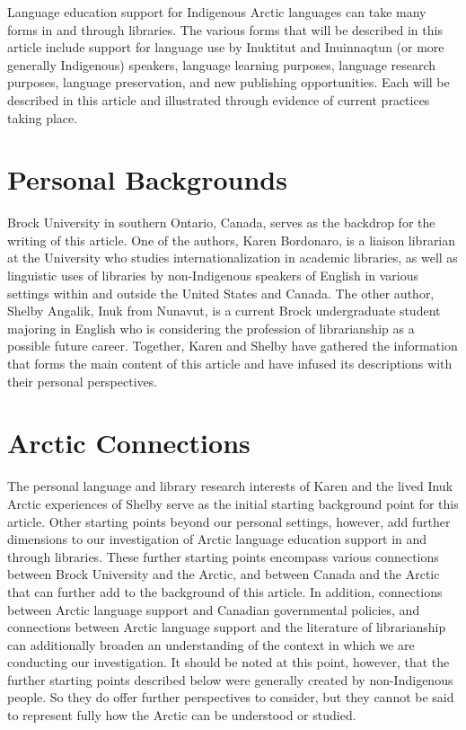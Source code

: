\documentclass[a4paper,
fontsize=11pt,
oneside,
numbers=noperiodatend,
parskip=half-,
bibliography=totoc,
final
]{scrartcl}
\begin{document}
Language education support for Indigenous Arctic languages can take many
forms in and through libraries. The various forms that will be described
in this article include support for language use by Inuktitut and
Inuinnaqtun (or more generally Indigenous) speakers, language learning
purposes, language research purposes, language preservation, and new
publishing opportunities. Each will be described in this article and
illustrated through evidence of current practices taking place.

\hypertarget{personal-backgrounds}{%
\section{Personal Backgrounds}\label{personal-backgrounds}}

Brock University in southern Ontario, Canada, serves as the backdrop for
the writing of this article. One of the authors, Karen Bordonaro, is a
liaison librarian at the University who studies internationalization in
academic libraries, as well as linguistic uses of libraries by
non-Indigenous speakers of English in various settings within and
outside the United States and Canada. The other author, Shelby Angalik,
Inuk from Nunavut, is a current Brock undergraduate student majoring in
English who is considering the profession of librarianship as a possible
future career. Together, Karen and Shelby have gathered the information
that forms the main content of this article and have infused its
descriptions with their personal perspectives.

\hypertarget{arctic-connections}{%
\section{Arctic Connections}\label{arctic-connections}}

The personal language and library research interests of Karen and the
lived Inuk Arctic experiences of Shelby serve as the initial starting
background point for this article. Other starting points beyond our
personal settings, however, add further dimensions to our investigation
of Arctic language education support in and through libraries. These
further starting points encompass various connections between Brock
University and the Arctic, and between Canada and the Arctic that can
further add to the background of this article. In addition, connections
between Arctic language support and Canadian governmental policies, and
connections between Arctic language support and the literature of
librarianship can additionally broaden an understanding of the context
in which we are conducting our investigation. It should be noted at this
point, however, that the further starting points described below were
generally created by non-Indigenous people. So they do offer further
perspectives to consider, but they cannot be said to represent fully how
the Arctic can be understood or studied.
\end{document}
